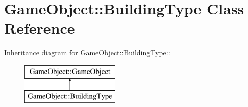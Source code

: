 \hypertarget{classGameObject_1_1BuildingType}{
\section{GameObject::BuildingType Class Reference}
\label{classGameObject_1_1BuildingType}
}
Inheritance diagram for GameObject::BuildingType::\begin{figure}[H]
\begin{center}
\leavevmode
\includegraphics[height=2cm]{classGameObject_1_1BuildingType}
\end{center}
\end{figure}
